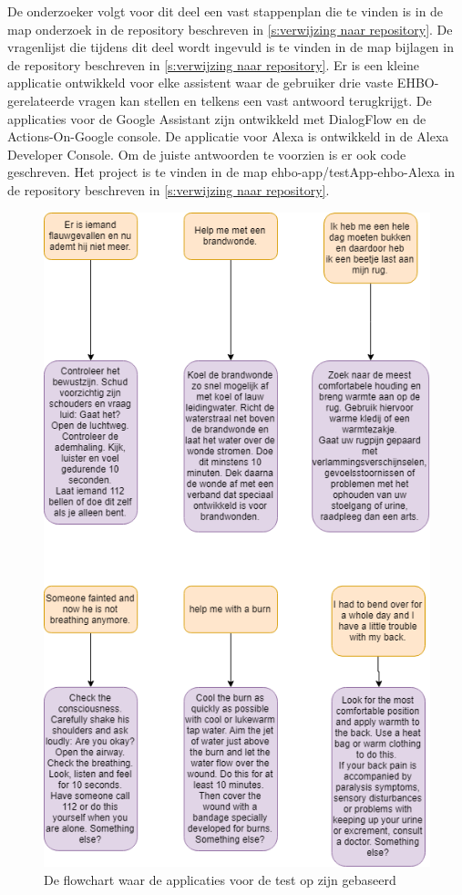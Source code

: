 De onderzoeker volgt voor dit deel een vast stappenplan die te vinden is in de map onderzoek in de repository beschreven in \ref{s:verwijzing naar repository}.
De vragenlijst die tijdens dit deel wordt ingevuld is te vinden in de map bijlagen in de repository beschreven in \ref{s:verwijzing naar repository}.
Er is een kleine applicatie ontwikkeld voor elke assistent waar de gebruiker drie vaste EHBO-gerelateerde vragen kan stellen en telkens een vast antwoord terugkrijgt. De applicaties voor de Google Assistant zijn ontwikkeld met DialogFlow en de Actions-On-Google console. De applicatie voor Alexa is ontwikkeld in de Alexa Developer Console. Om de juiste antwoorden te voorzien is er ook code geschreven. Het project is te vinden in de map ehbo-app/testApp-ehbo-Alexa in de repository beschreven in \ref{s:verwijzing naar repository}.

\begin{figure}[h]
    \includegraphics[width=0.7\linewidth]{img/flowdiagram_testapp}
    \caption{De flowchart waar de applicaties voor de test op zijn gebaseerd}
    \label{fig:flowdiagram}
\end{figure}

